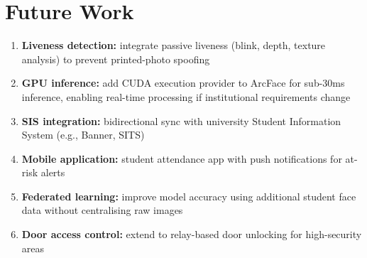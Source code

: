 \documentclass[12pt,a4paper]{report}
\begin{document}
\section{Future Work}
\begin{enumerate}
  \item \textbf{Liveness detection:} integrate passive liveness (blink, depth, texture analysis) to prevent printed-photo spoofing
  \item \textbf{GPU inference:} add CUDA execution provider to ArcFace for sub-30ms inference, enabling real-time processing if institutional requirements change
  \item \textbf{SIS integration:} bidirectional sync with university Student Information System (e.g., Banner, SITS)
  \item \textbf{Mobile application:} student attendance app with push notifications for at-risk alerts
  \item \textbf{Federated learning:} improve model accuracy using additional student face data without centralising raw images
  \item \textbf{Door access control:} extend to relay-based door unlocking for high-security areas
\end{enumerate}
\end{document}
